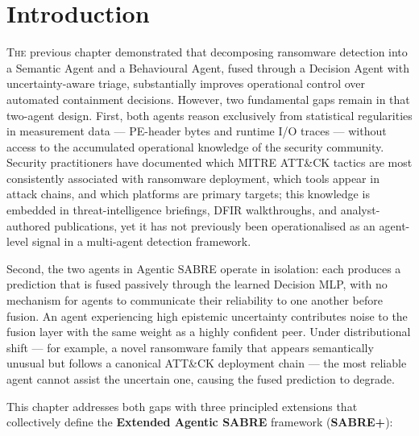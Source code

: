 

\section{Introduction}
\label{sec:tifs_intro}

\lettrine{T}{he} previous chapter demonstrated that decomposing ransomware detection into a Semantic Agent and a Behavioural Agent, fused through a Decision Agent with uncertainty-aware triage, substantially improves operational control over automated containment decisions. However, two fundamental gaps remain in that two-agent design. First, both agents reason exclusively from statistical regularities in measurement data — PE-header bytes and runtime I/O traces — without access to the accumulated operational knowledge of the security community. Security practitioners have documented which MITRE ATT\&CK tactics are most consistently associated with ransomware deployment, which tools appear in attack chains, and which platforms are primary targets; this knowledge is embedded in threat-intelligence briefings, DFIR walkthroughs, and analyst-authored publications, yet it has not previously been operationalised as an agent-level signal in a multi-agent detection framework.

Second, the two agents in Agentic SABRE operate in isolation: each produces a prediction that is fused passively through the learned Decision MLP, with no mechanism for agents to communicate their reliability to one another before fusion. An agent experiencing high epistemic uncertainty contributes noise to the fusion layer with the same weight as a highly confident peer. Under distributional shift — for example, a novel ransomware family that appears semantically unusual but follows a canonical ATT\&CK deployment chain — the most reliable agent cannot assist the uncertain one, causing the fused prediction to degrade.

This chapter addresses both gaps with three principled extensions that collectively define the \textbf{Extended Agentic SABRE} framework (\textbf{SABRE+}):

